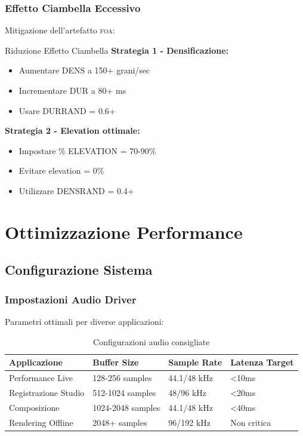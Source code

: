 \documentclass[a4paper,11pt,openany]{book}
\newcommand{\foa}{\textsc{foa}}
\begin{document}
\subsubsection{Effetto Ciambella Eccessivo}

Mitigazione dell'artefatto \foa:

\begin{exemplo}{Riduzione Effetto Ciambella}
\textbf{Strategia 1 - Densificazione:}
\begin{itemize}
    \item Aumentare DENS a 150+ grani/sec
    \item Incrementare DUR a 80+ ms
    \item Usare DURRAND = 0.6+
\end{itemize}

\textbf{Strategia 2 - Elevation ottimale:}
\begin{itemize}
    \item Impostare \% ELEVATION = 70-90\%
    \item Evitare elevation = 0\%
    \item Utilizzare DENSRAND = 0.4+
\end{itemize}
\end{exemplo}

\section{Ottimizzazione Performance}

\subsection{Configurazione Sistema}

\subsubsection{Impostazioni Audio Driver}

Parametri ottimali per diverse applicazioni:

\begin{table}[H]
    \centering
    \caption{Configurazioni audio consigliate}
    \label{tab:audio_settings}
    \begin{tabular}{@{}p{3cm}p{3cm}p{3cm}p{3cm}@{}}
        \toprule
        \textbf{Applicazione} & \textbf{Buffer Size} & \textbf{Sample Rate} & \textbf{Latenza Target} \\
        \midrule
        Performance Live & 128-256 samples & 44.1/48 kHz & <10ms \\
        Registrazione Studio & 512-1024 samples & 48/96 kHz & <20ms \\
        Composizione & 1024-2048 samples & 44.1/48 kHz & <40ms \\
        Rendering Offline & 2048+ samples & 96/192 kHz & Non critica \\
        \bottomrule
    \end{tabular}
\end{table}
\end{document}
